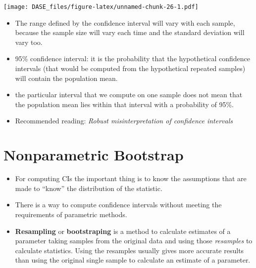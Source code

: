 \documentclass[]{book}
\providecommand{\tightlist}{%
  \setlength{\itemsep}{0pt}\setlength{\parskip}{0pt}}
\begin{document}
\texttt{[image: DASE\_files/figure-latex/unnamed-chunk-26-1.pdf]}

\begin{itemize}
\tightlist
\item
  The range defined by the confidence interval will vary with each
  sample, because the sample size will vary each time and the standard
  deviation will vary too.
\item
  95\% confidence interval: it is the probability that the hypothetical
  confidence intervals (that would be computed from the hypothetical
  repeated samples) will contain the population mean.
\item
  the particular interval that we compute on one sample does not mean
  that the population mean lies within that interval with a probability
  of 95\%.
\item
  Recommended reading: \citep{Hoekstra2014} \emph{Robust
  misinterpretation of confidence intervals}
\end{itemize}

\section{Nonparametric Bootstrap}\label{nonparametric-bootstrap}

\begin{itemize}
\tightlist
\item
  For computing CIs the important thing is to know the assumptions that
  are made to ``know'' the distribution of the statistic.
\item
  There is a way to compute confidence intervals without meeting the
  requirements of parametric methods.
\item
  \textbf{Resampling} or \textbf{bootstraping} is a method to calculate
  estimates of a parameter taking samples from the original data and
  using those \emph{resamples} to calculate statistics. Using the
  resamples usually gives more accurate results than using the original
  single sample to calculate an estimate of a parameter.
\end{itemize}
\end{document}
